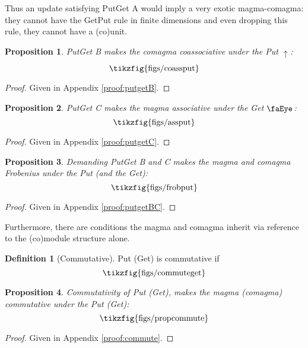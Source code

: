 \documentclass[submission,copyright,creativecommons,sharealike,noncommercial]{eptcs}
\newcommand{\tikzfigscale}[2]{\scalebox{#1}{\tikzfig{#2}}}
\newcommand{\putt}[1]{\mathbin{\uparrow_{#1}}}
\newcommand{\get}[1]{\operatorname{\text{\faEye}}_{#1}}
\theoremstyle{definition}
\newtheorem{defn}{Definition}
\theoremstyle{plain}
\newtheorem{prop}{Proposition}
\theoremstyle{plain}
\begin{document}
Thus an update satisfying PutGet A would imply a very exotic magma-comagma: they cannot have the GetPut rule in finite dimensions and even dropping this rule, they cannot have a (co)unit.

\begin{prop}\label{prop:putgetB}
    PutGet B makes the comagma coassociative under the Put $\putt{}$:
    \begin{equation*}
    \tikzfigscale{1}{figs/coassput}
    \end{equation*}
\end{prop}
\begin{proof}
Given in Appendix \ref{proof:putgetB}.
\end{proof}

\begin{prop}\label{prop:putgetC}
    PutGet C makes the magma associative under the Get $\get{}$:
    \begin{equation*}
    \tikzfigscale{1}{figs/assput}
    \end{equation*}
\end{prop}
\begin{proof}
Given in Appendix \ref{proof:putgetC}.
\end{proof}

\begin{prop}\label{prop:putgetBC}
    Demanding PutGet B and C makes the magma and comagma Frobenius under the Put (and the Get):
    \begin{equation*}
    \tikzfigscale{1}{figs/frobput}
    \end{equation*}
\end{prop}
\begin{proof}
Given in Appendix \ref{proof:putgetBC}.
\end{proof}
    



Furthermore, there are conditions the magma and comagma inherit via reference to the (co)module structure alone.

\begin{defn}[Commutative] Put (Get) is commutative if
\begin{equation}\label{commuteget}
    \tikzfigscale{1}{figs/commuteget}
\end{equation}
\end{defn}
\begin{prop}\label{prop:commute}
    Commutativity of Put (Get), makes the magma (comagma) commutative under the Put (Get):
    \begin{equation*}
    \tikzfigscale{1}{figs/propcommute}
    \end{equation*}
\end{prop}
\begin{proof}
Given in Appendix \ref{proof:commute}.
\end{proof}
\end{document}
